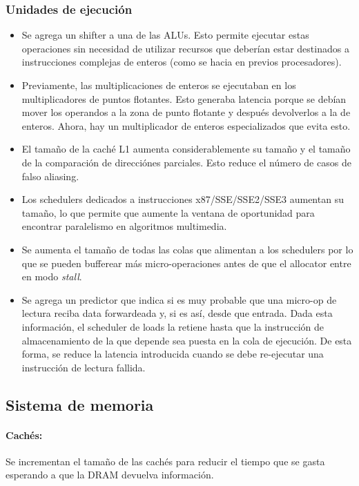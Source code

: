 \subsubsection{Unidades de ejecución}
\begin{itemize}
\item Se agrega un shifter a una de las ALUs. Esto permite ejecutar estas operaciones  sin necesidad de utilizar recursos que deberían estar destinados a instrucciones complejas de enteros (como se hacia en previos procesadores).

\item Previamente, las multiplicaciones de enteros se ejecutaban en los multiplicadores de puntos flotantes. Esto generaba latencia porque se debían mover los operandos a la zona de punto flotante y después devolverlos a la de enteros. Ahora, hay un multiplicador de enteros especializados que evita esto.

\item El tamaño de la caché L1 aumenta considerablemente su tamaño y el tamaño de la comparación de direcciónes parciales. Esto reduce el número de casos de falso aliasing.

\item Los schedulers dedicados a instrucciones x87/SSE/SSE2/SSE3 aumentan su tamaño, lo que permite que aumente la ventana de oportunidad para encontrar paralelismo en algoritmos multimedia. 

\item Se aumenta el tamaño de todas las colas que alimentan a los schedulers por lo que se pueden bufferear más micro-operaciones antes de que el allocator entre en modo \textit{stall}.

\item Se agrega un predictor que indica si es muy probable que una micro-op de lectura reciba data forwardeada y, si es así, desde que entrada. Dada esta información, el scheduler de loads la retiene hasta que la instrucción de almacenamiento de la que depende sea puesta en la cola de ejecución. De esta forma, se reduce la latencia introducida cuando se debe re-ejecutar una instrucción de lectura fallida.
\end{itemize}

\subsection{Sistema de memoria}
\paragraph{Cachés:} Se incrementan el tamaño de las cachés para reducir el tiempo que se gasta esperando a que la DRAM devuelva información.

